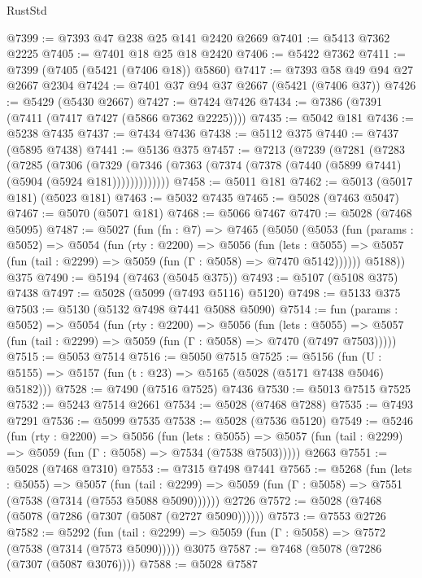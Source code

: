 \begin{lexlean}{RustStd}
\begin{coremodule}
@7399 := @7393 @47 @238 @25 @141 @2420 @2669
@7401 := @5413 @7362 @2225
@7405 := @7401 @18 @25 @18 @2420
@7406 := @5422 @7362
@7411 := @7399 (@7405 (@5421 (@7406 @18)) @5860)
@7417 := @7393 @58 @49 @94 @27 @2667 @2304
@7424 := @7401 @37 @94 @37 @2667 (@5421 (@7406 @37))
@7426 := @5429 (@5430 @2667)
@7427 := @7424 @7426
@7434 := @7386 (@7391 (@7411 (@7417 @7427 (@5866 @7362 @2225))))
@7435 := @5042 @181
@7436 := @5238 @7435
@7437 := @7434 @7436
@7438 := @5112 @375
@7440 := @7437 (@5895 @7438)
@7441 := @5136 @375
@7457 := @7213
    (@7239
      (@7281
        (@7283
          (@7285
            (@7306
              (@7329
                (@7346 (@7363 (@7374 (@7378 (@7440 (@5899 @7441) (@5904 (@5924 @181)))))))))))))
@7458 := @5011 @181
@7462 := @5013 (@5017 @181) (@5023 @181)
@7463 := @5032 @7435
@7465 := @5028 (@7463 @5047)
@7467 := @5070 (@5071 @181)
@7468 := @5066 @7467
@7470 := @5028 (@7468 @5095)
@7487 := @5027
    (fun (fn : @7) =>
    @7465
      (@5050
        (@5053
          (fun (params : @5052) =>
          @5054
            (fun (rty : @2200) =>
            @5056
              (fun (lets : @5055) =>
              @5057 (fun (tail : @2299) => @5059 (fun (Γ : @5058) => @7470 @5142))))))
        @5188))
    @375
@7490 := @5194 (@7463 (@5045 @375))
@7493 := @5107 (@5108 @375) @7438
@7497 := @5028 (@5099 (@7493 @5116) @5120)
@7498 := @5133 @375
@7503 := @5130 (@5132 @7498 @7441 @5088 @5090)
@7514 := fun (params : @5052) =>
  @5054
    (fun (rty : @2200) =>
    @5056
      (fun (lets : @5055) =>
      @5057 (fun (tail : @2299) => @5059 (fun (Γ : @5058) => @7470 (@7497 @7503)))))
@7515 := @5053 @7514
@7516 := @5050 @7515
@7525 := @5156 (fun (U : @5155) => @5157 (fun (t : @23) => @5165 (@5028 (@5171 @7438 @5046) @5182)))
@7528 := @7490 (@7516 @7525) @7436
@7530 := @5013 @7515 @7525
@7532 := @5243 @7514 @2661
@7534 := @5028 (@7468 @7288)
@7535 := @7493 @7291
@7536 := @5099 @7535
@7538 := @5028 (@7536 @5120)
@7549 := @5246
    (fun (rty : @2200) =>
    @5056
      (fun (lets : @5055) =>
      @5057 (fun (tail : @2299) => @5059 (fun (Γ : @5058) => @7534 (@7538 @7503)))))
    @2663
@7551 := @5028 (@7468 @7310)
@7553 := @7315 @7498 @7441
@7565 := @5268
    (fun (lets : @5055) =>
    @5057
      (fun (tail : @2299) => @5059 (fun (Γ : @5058) => @7551 (@7538 (@7314 (@7553 @5088 @5090))))))
    @2726
@7572 := @5028 (@7468 (@5078 (@7286 (@7307 (@5087 (@2727 @5090))))))
@7573 := @7553 @2726
@7582 := @5292
    (fun (tail : @2299) => @5059 (fun (Γ : @5058) => @7572 (@7538 (@7314 (@7573 @5090)))))
    @3075
@7587 := @7468 (@5078 (@7286 (@7307 (@5087 @3076))))
@7588 := @5028 @7587

\end{coremodule}
\end{lexlean}
